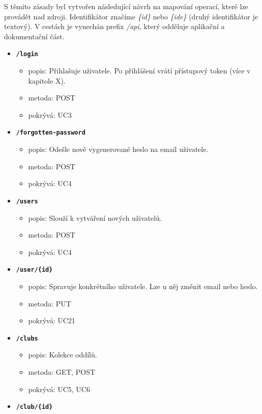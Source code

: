 S těmito zásady byl vytvořen následující návrh na mapování operací, které lze provádět nad zdroji.
Identifikátor značíme \textit{\{id\}} nebo \textit{\{ide\}} (druhý identifikátor je textový).
V cestách je vynechán prefix \textit{/api}, který odděluje aplikační a dokumentační část.

\begin{itemize}
  \item \texttt{\textbf{/login}}
  \begin{itemize}
    \item popis: Přihlašuje uživatele. Po přihlášení vrátí přístupový token (více v kapitole X).
    \item metoda: POST
    \item pokrývá: UC3
  \end{itemize}
  \item \texttt{\textbf{/forgotten-password}}
  \begin{itemize}
    \item popis: Odešle nově vygenerované heslo na email uživatele.
    \item metoda: POST
    \item pokrývá: UC4
  \end{itemize}
  \item \texttt{\textbf{/users}}
  \begin{itemize}
    \item popis: Slouží k vytváření nových uživatelů.
    \item metoda: POST
    \item pokrývá: UC4
  \end{itemize}
  \item \texttt{\textbf{/user/\{id\}}}
  \begin{itemize}
    \item popis: Spravuje konkrétního uživatele. Lze u něj změnit email nebo heslo.
    \item metoda: PUT
    \item pokrývá: UC21
  \end{itemize}
  \item \texttt{\textbf{/clubs}}
  \begin{itemize}
    \item popis: Kolekce oddílů.
    \item metoda: GET, POST
    \item pokrývá: UC5, UC6
  \end{itemize}
  \item \texttt{\textbf{/club/\{id\}}}
  \begin{itemize}

\end{itemize}
\end{itemize}
